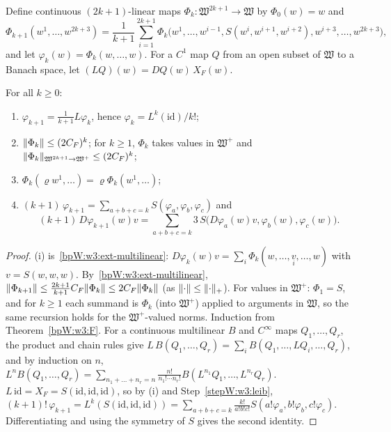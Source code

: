 \begin{definition}\label{bpW:w3:lie-coeff}
Define continuous $(2k+1)$-linear maps $\Phi_k:\mathfrak W^{2k+1}\to\mathfrak W$ by $\Phi_0(w)=w$ and
\[\Phi_{k+1}(w^1,\dots,w^{2k+3})=\frac1{k+1}\sum_{i=1}^{2k+1}\Phi_k\bigl(w^1,\dots,w^{i-1},S(w^i,w^{i+1},w^{i+2}),w^{i+3},\dots,w^{2k+3}\bigr),\]
and let $\varphi_k(w)=\Phi_k(w,\dots,w)$. For a $C^1$ map $Q$ from an open subset of $\mathfrak W$ to a Banach space,
let $(LQ)(w)=DQ(w)\,X_F(w)$.
\end{definition}

\begin{lemma}\label{bpW:w3:leibniz}
For all $k\ge0$:
\begin{enumerate}[label=(\roman*)]
\item $\varphi_{k+1}=\frac1{k+1}L\varphi_k$, hence $\varphi_k=L^k(\mathrm{id})/k!$;
\item $\lVert \Phi_k\rVert\le(2C_F)^k$; for $k\ge1$, $\Phi_k$ takes values in $\mathfrak W^+$ and
  $\lVert \Phi_k\rVert_{\mathfrak W^{2k+1}\to\mathfrak W^+}\le(2C_F)^k$;
\item $\Phi_k(\varrho w^1,\dots)=\varrho\Phi_k(w^1,\dots)$;
\item $(k+1)\,\varphi_{k+1}=\sum_{a+b+c=k}S(\varphi_a,\varphi_b,\varphi_c)$ and
  \[(k+1)\,D\varphi_{k+1}(w)v=\sum_{a+b+c=k}3\,S\bigl(D\varphi_a(w)v,\varphi_b(w),\varphi_c(w)\bigr).\]
\end{enumerate}
\end{lemma}

\begin{proof}
\label{stepW:w3:rec}
(i) is~\ref{bpW:w3:ext-multilinear}: $D\varphi_k(w)v=\sum_i\Phi_k(w,\dots,\underset iv,\dots,w)$ with
$v=S(w,w,w)$.
\label{stepW:w3:norms}
By~\ref{bpW:w3:ext-multilinear}, $\lVert \Phi_{k+1}\rVert\le\frac{2k+1}{k+1}C_F\lVert \Phi_k\rVert\le2C_F\lVert \Phi_k\rVert$ (as
$\lVert \cdot\rVert\le\lVert \cdot\rVert_+$). For values in $\mathfrak W^+$: $\Phi_1=S$, and for $k\ge1$ each summand is
$\Phi_k$ (into $\mathfrak W^+$) applied to arguments in $\mathfrak W$, so the same recursion holds for the
$\mathfrak W^+$-valued norms.
\label{stepW:w3:Phireal}
Induction from Theorem~\ref{bpW:w3:F}.
\label{stepW:w3:leib}
For a continuous multilinear $B$ and $C^\infty$ maps $Q_1,\dots,Q_r$, the product and chain rules give
$L\,B(Q_1,\dots,Q_r)=\sum_iB(Q_1,\dots,LQ_i,\dots,Q_r)$, and by induction on $n$,
$L^nB(Q_1,\dots,Q_r)=\sum_{n_1+\dots+n_r=n}\frac{n!}{n_1!\cdots n_r!}B(L^{n_1}Q_1,\dots,L^{n_r}Q_r)$.
\label{stepW:w3:leibid}
$L\,\mathrm{id}=X_F=S(\mathrm{id},\mathrm{id},\mathrm{id})$, so by (i) and Step~\ref{stepW:w3:leib},
$(k+1)!\,\varphi_{k+1}=L^k(S(\mathrm{id},\mathrm{id},\mathrm{id}))=\sum_{a+b+c=k}\frac{k!}{a!b!c!}S(a!\varphi_a,b!\varphi_b,c!\varphi_c)$.
Differentiating and using the symmetry of $S$ gives the second identity.
\end{proof}

